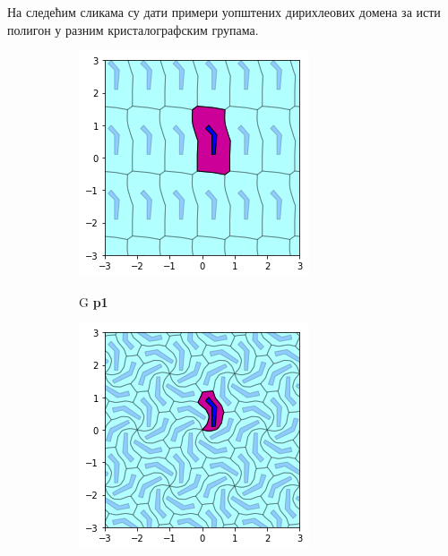 \documentclass[12pt]{report}
\begin{document}
\begin{samepage}
 На следећим сликама су дати примери уопштених дирихлеових домена за исти полигон у разним кристалографским групама.
 \begin{figure}[H]

  \begin{subfigure}[b]{0.3\textwidth}
    \includegraphics[width=\textwidth]{output_21_1.png}
    \label{fig:f20}
    \caption{G \textbf{p1}}
  \end{subfigure}
  \begin{subfigure}[b]{0.3\textwidth}
    \includegraphics[width=\textwidth]{output_21_2.png}

\end{subfigure}
\end{figure}
\end{samepage}
\end{document}
